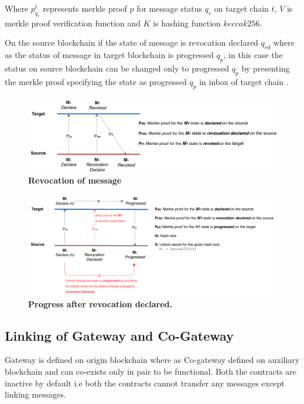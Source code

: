\documentclass[12pt,a4paper]{article}
\begin{document}
Where $p^t_{q_r}$ represents merkle proof $p$ for message status $q_r$ on target chain $t$, $V$ is merkle proof verification function and $K$ is hashing function $keccak256$.

 
On the source blockchain if the state of message is revocation declared $q_{rd}$ where as the status of message in target blockchain is progressed ${q_p}$, in this case the status on source blockchain can be changed only to progressed ${q_p}$ by presenting the merkle proof specifying the state as progressed ${q_p}$ in inbox of target chain .

\begin{figure}[htb]
    \centering
	\includegraphics[width=\textwidth]{revocation}
	\caption{\textbf{ Revocation of message}}
	\label{fig:revocation}
\end{figure}


\begin{figure}[htb]
    \centering
	\includegraphics[width=\textwidth]{revocation_progress}
	\caption{\textbf{ Progress after revocation declared.}}
	\label{fig:revocation}
\end{figure}

\subsection{Linking of Gateway and Co-Gateway}\label{gateway:linking}
Gateway is defined on origin blockchain where as Co-gateway defined on auxiliary blockchain and can co-exists only in pair to be functional. 
Both the contracts are inactive by default i.e both the contracts cannot transfer any messages except linking messages.
 
\end{document}
